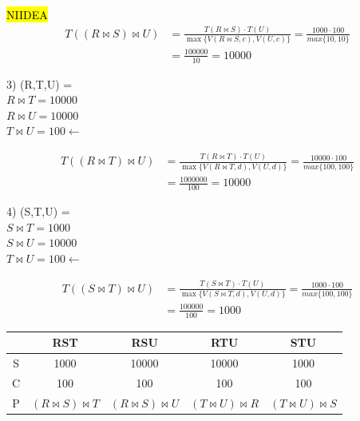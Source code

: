 \documentclass{templateNote}
\begin{document}
\begin{enumerate}
\begin{enumerate}[label=\alph*)]
\begin{enumerate}[label=\alph*)]
                \hl{NIIDEA}
                \begin{align*}
                    T((R \Join S) \Join U) &= \frac{T(R \Join S)\cdot T(U)}{\max\{V(R \Join S,c),V(U,c)\}} = \frac{1000\cdot100}{max\{10,10\}} \\ 
                    &= \frac{100000}{10} = 10000
                \end{align*}
                
                3) (R,T,U) = \\
                \hspace*{0.25cm}$R \Join T = 10000$ \\
                \hspace*{0.25cm}$R \Join U = 10000$ \\
                \hspace*{0.25cm}$T \Join U = 100 \leftarrow$

                \begin{align*}
                    T((R \Join T) \Join U) &= \frac{T(R \Join T)\cdot T(U)}{\max\{V(R \Join T,d),V(U,d)\}} = \frac{10000\cdot100}{max\{100,100\}} \\ 
                    &= \frac{1000000}{100} = 10000
                \end{align*}

                4) (S,T,U) = \\
                \hspace*{0.25cm}$S \Join T = 1000$ \\
                \hspace*{0.25cm}$S \Join U = 10000$ \\
                \hspace*{0.25cm}$T \Join U = 100 \leftarrow$

                \begin{align*}
                    T((S \Join T) \Join U) &= \frac{T(S \Join T)\cdot T(U)}{\max\{V(S \Join T,d),V(U,d)\}} = \frac{1000\cdot100}{max\{100,100\}} \\ 
                    &= \frac{100000}{100} = 1000
                \end{align*}

                \begin{tabular}{|c|c|c|c|c|}
                    \hline
                    & RST & RSU & RTU & STU \\
                    \hline
                    S & 1000 & 10000 & 10000 & 1000 \\
                    \hline
                    C & 100 & 100 & 100 & 100  \\
                    \hline
                    P & $(R \Join S) \Join T$ & $(R \Join S) \Join U$ & $(T \Join U) \Join R$ & $(T \Join U) \Join S$ \\
                    \hline
                \end{tabular}
                

\end{enumerate}
\end{enumerate}
\end{enumerate}
\end{document}
